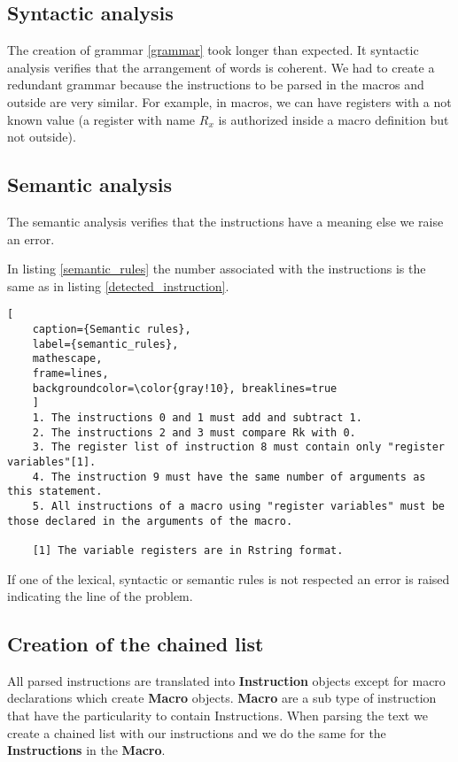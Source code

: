 \newpage
\subsection{Syntactic analysis}

The creation of grammar \ref{grammar} took longer than expected. It syntactic analysis verifies that the arrangement of words is coherent. We had to create a redundant grammar because the instructions to be parsed in the macros and outside are very similar. For example, in macros, we can have registers with a not known value (a register with name \textbf{$R_x$} is authorized inside a macro definition but not outside).

\subsection{Semantic analysis}
The semantic analysis verifies that the instructions have a meaning else we raise an error. 

In listing \ref{semantic_rules} the number associated with the instructions is the same as in listing \ref{detected_instruction}.

\begin{lstlisting}[
    caption={Semantic rules}, 
    label={semantic_rules},
    mathescape, 
    frame=lines,
    backgroundcolor=\color{gray!10}, breaklines=true
    ]
    1. The instructions 0 and 1 must add and subtract 1.
    2. The instructions 2 and 3 must compare Rk with 0.
    3. The register list of instruction 8 must contain only "register variables"[1].
    4. The instruction 9 must have the same number of arguments as this statement.
    5. All instructions of a macro using "register variables" must be those declared in the arguments of the macro.

    [1] The variable registers are in Rstring format.
\end{lstlisting}

If one of the lexical, syntactic or semantic rules is not respected an error is raised indicating the line of the problem.

\subsection{Creation of the chained list}

All parsed instructions are translated into \textbf{Instruction} objects except for macro declarations which create \textbf{Macro} objects. \textbf{Macro} are a sub type of instruction that have the particularity to contain Instructions. When parsing the text we create a chained list with our instructions and we do the same for the \textbf{Instructions} in the \textbf{Macro}.

